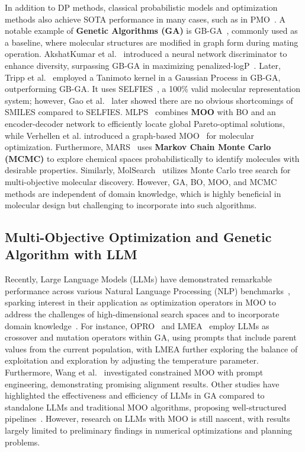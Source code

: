 In addition to DP methods, classical probabilistic models and optimization methods also achieve SOTA performance in many cases, such as in PMO~\cite{pmo}. A notable example of \textbf{Genetic Algorithms (GA)} is GB-GA~\cite{gbga}, commonly used as a baseline, where molecular structures are modified in graph form during mating operation. AkshatKumar et al.~\cite{gadt} introduced a neural network discriminator to enhance diversity, surpassing GB-GA in maximizing penalized-logP~\cite{gomez2018plogp}. Later, Tripp et al.~\cite{tripp2021gb-bo} employed a Tanimoto kernel in a Gaussian Process in GB-GA, outperforming GB-GA. It uses SELFIES~\cite{krenn2020selfies}, a 100\% valid molecular representation system; however, Gao et al.~\cite{pmo} later showed there are no obvious shortcomings of SMILES compared to SELFIES. MLPS~\cite{mlps} combines \textbf{MOO} with BO and an encoder-decoder network to efficiently locate global Pareto-optimal solutions, while Verhellen et al. introduced a graph-based MOO~\cite{verhellen2022graph} for molecular optimization. Furthermore, MARS~\cite{mars} uses \textbf{Markov Chain Monte Carlo (MCMC)} to explore chemical spaces probabilistically to identify molecules with desirable properties. Similarly, MolSearch~\cite{sun2022molsearch} utilizes Monte Carlo tree search for multi-objective molecular discovery. However, GA, BO, MOO, and MCMC methods are independent of domain knowledge, which is highly beneficial in molecular design but challenging to incorporate into such algorithms.


\subsection{Multi-Objective Optimization and Genetic Algorithm with LLM}
Recently, Large Language Models (LLMs) have demonstrated remarkable performance across various Natural Language Processing (NLP) benchmarks~\cite{brown2020gpt,ai4science2023impact}, sparking interest in their application as optimization operators in MOO to address the challenges of high-dimensional search spaces and to incorporate domain knowledge~\cite{2024EALLMsurvey}. For instance, OPRO~\cite{opro} and LMEA~\cite{lmea} employ LLMs as crossover and mutation operators within GA, using prompts that include parent values from the current population, with LMEA further exploring the balance of exploitation and exploration by adjusting the temperature parameter. Furthermore, Wang et al.~\cite{2024ConstrainedMOLLM} investigated constrained MOO with prompt engineering, demonstrating promising alignment results. Other studies have highlighted the effectiveness and efficiency of LLMs in GA compared to standalone LLMs and traditional MOO algorithms, proposing well-structured pipelines~\cite{liu2023algorithm,liu2024evolution,liu2024large,huang2024exploring,brahmachary2024llmleo}. However, research on LLMs with MOO is still nascent, with results largely limited to preliminary findings in numerical optimizations and planning problems.

